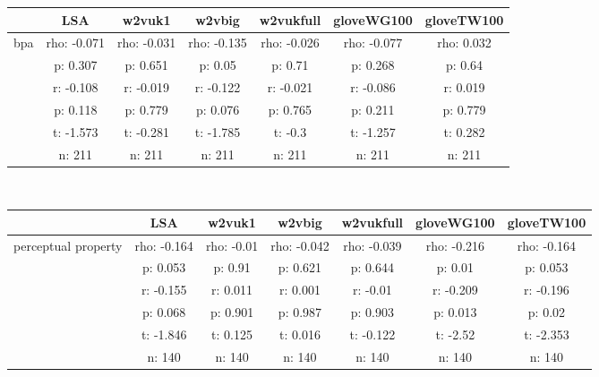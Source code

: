 \documentclass{article}
\begin{document}
\begin{tabular}{ccccccc|}\cline{2-7}
&\multicolumn{1}{|c}{LSA} & w2vuk1 & w2vbig & w2vukfull & gloveWG100 & gloveTW100 \\\hline
\multicolumn{1}{|c|}{\multirow{6}{*}{bpa}} & rho: -0.071 & rho: -0.031 & rho: -0.135 & rho: -0.026 & rho: -0.077 & rho: 0.032 \\
\multicolumn{1}{|c|}{} & p: 0.307 & p: 0.651 & p: 0.05 & p: 0.71 & p: 0.268 & p: 0.64 \\
\multicolumn{1}{|c|}{} & r: -0.108 & r: -0.019 & r: -0.122 & r: -0.021 & r: -0.086 & r: 0.019 \\
\multicolumn{1}{|c|}{} & p: 0.118 & p: 0.779 & p: 0.076 & p: 0.765 & p: 0.211 & p: 0.779 \\
\multicolumn{1}{|c|}{} & t: -1.573 & t: -0.281 & t: -1.785 & t: -0.3 & t: -1.257 & t: 0.282 \\
\multicolumn{1}{|c|}{} & n: 211 & n: 211 & n: 211 & n: 211 & n: 211 & n: 211 \\
\hline
\end{tabular}\\
\begin{tabular}{ccccccc|}\cline{2-7}
&\multicolumn{1}{|c}{LSA} & w2vuk1 & w2vbig & w2vukfull & gloveWG100 & gloveTW100 \\\hline
\multicolumn{1}{|c|}{\multirow{6}{*}{perceptual property}} & rho: -0.164 & rho: -0.01 & rho: -0.042 & rho: -0.039 & rho: -0.216 & rho: -0.164 \\
\multicolumn{1}{|c|}{} & p: 0.053 & p: 0.91 & p: 0.621 & p: 0.644 & p: 0.01 & p: 0.053 \\
\multicolumn{1}{|c|}{} & r: -0.155 & r: 0.011 & r: 0.001 & r: -0.01 & r: -0.209 & r: -0.196 \\
\multicolumn{1}{|c|}{} & p: 0.068 & p: 0.901 & p: 0.987 & p: 0.903 & p: 0.013 & p: 0.02 \\
\multicolumn{1}{|c|}{} & t: -1.846 & t: 0.125 & t: 0.016 & t: -0.122 & t: -2.52 & t: -2.353 \\
\multicolumn{1}{|c|}{} & n: 140 & n: 140 & n: 140 & n: 140 & n: 140 & n: 140 \\
\hline
\end{tabular}\\
\end{document}
